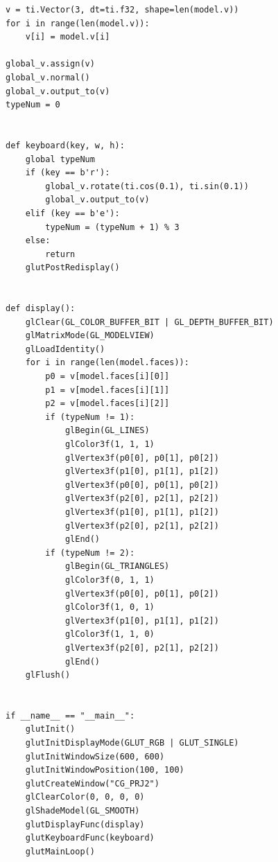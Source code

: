 \documentclass[thesis]{thesis}
\begin{document}
\begin{lstlisting}
v = ti.Vector(3, dt=ti.f32, shape=len(model.v))
for i in range(len(model.v)):
    v[i] = model.v[i]

global_v.assign(v)
global_v.normal()
global_v.output_to(v)
typeNum = 0


def keyboard(key, w, h):
    global typeNum
    if (key == b'r'):
        global_v.rotate(ti.cos(0.1), ti.sin(0.1))
        global_v.output_to(v)
    elif (key == b'e'):
        typeNum = (typeNum + 1) % 3
    else:
        return
    glutPostRedisplay()


def display():
    glClear(GL_COLOR_BUFFER_BIT | GL_DEPTH_BUFFER_BIT)
    glMatrixMode(GL_MODELVIEW)
    glLoadIdentity()
    for i in range(len(model.faces)):
        p0 = v[model.faces[i][0]]
        p1 = v[model.faces[i][1]]
        p2 = v[model.faces[i][2]]
        if (typeNum != 1):
            glBegin(GL_LINES)
            glColor3f(1, 1, 1)
            glVertex3f(p0[0], p0[1], p0[2])
            glVertex3f(p1[0], p1[1], p1[2])
            glVertex3f(p0[0], p0[1], p0[2])
            glVertex3f(p2[0], p2[1], p2[2])
            glVertex3f(p1[0], p1[1], p1[2])
            glVertex3f(p2[0], p2[1], p2[2])
            glEnd()
        if (typeNum != 2):
            glBegin(GL_TRIANGLES)
            glColor3f(0, 1, 1)
            glVertex3f(p0[0], p0[1], p0[2])
            glColor3f(1, 0, 1)
            glVertex3f(p1[0], p1[1], p1[2])
            glColor3f(1, 1, 0)
            glVertex3f(p2[0], p2[1], p2[2])
            glEnd()
    glFlush()


if __name__ == "__main__":
    glutInit()
    glutInitDisplayMode(GLUT_RGB | GLUT_SINGLE)
    glutInitWindowSize(600, 600)
    glutInitWindowPosition(100, 100)
    glutCreateWindow("CG_PRJ2")
    glClearColor(0, 0, 0, 0)
    glShadeModel(GL_SMOOTH)
    glutDisplayFunc(display)
    glutKeyboardFunc(keyboard)
    glutMainLoop()
\end{lstlisting}
\end{document}
